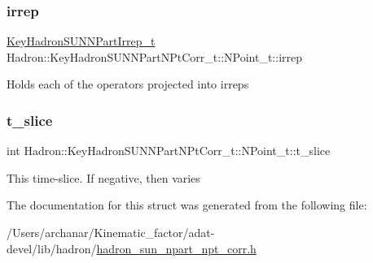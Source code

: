 \subsubsection{\texorpdfstring{irrep}{irrep}}
{\footnotesize\ttfamily \mbox{\hyperlink{structHadron_1_1KeyHadronSUNNPartIrrep__t}{Key\+Hadron\+S\+U\+N\+N\+Part\+Irrep\+\_\+t}} Hadron\+::\+Key\+Hadron\+S\+U\+N\+N\+Part\+N\+Pt\+Corr\+\_\+t\+::\+N\+Point\+\_\+t\+::irrep}

Holds each of the operators projected into irreps \mbox{\label{structHadron_1_1KeyHadronSUNNPartNPtCorr__t_1_1NPoint__t_a4c2126c62685080f6e33544a9ba60488}} 
\subsubsection{\texorpdfstring{t\_slice}{t\_slice}}
{\footnotesize\ttfamily int Hadron\+::\+Key\+Hadron\+S\+U\+N\+N\+Part\+N\+Pt\+Corr\+\_\+t\+::\+N\+Point\+\_\+t\+::t\+\_\+slice}

This time-\/slice. If negative, then varies 

The documentation for this struct was generated from the following file\+:\begin{DoxyCompactItemize}
\item 
/\+Users/archanar/\+Kinematic\+\_\+factor/adat-\/devel/lib/hadron/\mbox{\hyperlink{adat-devel_2lib_2hadron_2hadron__sun__npart__npt__corr_8h}{hadron\+\_\+sun\+\_\+npart\+\_\+npt\+\_\+corr.\+h}}\end{DoxyCompactItemize}

